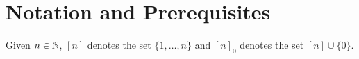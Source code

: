 \section{Notation and Prerequisites}
	
	Given $n \in \mathbb{N}$, $[n]$ denotes the set $\{1,\ldots,n\}$ and $[n]_0$ denotes the set $[n] \cup \{0\}$.

\clearpage